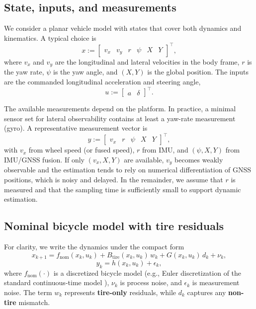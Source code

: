 \subsection{State, inputs, and measurements}\label{ch4_subsec_state_meas}
We consider a planar vehicle model with states that cover both dynamics and kinematics. A typical choice is
\begin{equation}
    x := \begin{bmatrix} v_x & v_y & r & \psi & X & Y \end{bmatrix}^{\top},
\end{equation}
where $v_x$ and $v_y$ are the longitudinal and lateral velocities in the body frame, $r$ is the yaw rate, $\psi$ is the yaw angle, and $(X,Y)$ is the global position.
The inputs are the commanded longitudinal acceleration and steering angle,
\begin{equation}
    u := \begin{bmatrix} a & \delta \end{bmatrix}^{\top}.
\end{equation}

The available measurements depend on the platform. In practice, a minimal sensor set for lateral observability contains at least a yaw-rate measurement (gyro). A representative measurement vector is
\begin{equation}
    y := \begin{bmatrix} v_x & r & \psi & X & Y \end{bmatrix}^{\top},
\end{equation}
with $v_x$ from wheel speed (or fused speed), $r$ from IMU, and $(\psi,X,Y)$ from IMU/GNSS fusion.
If only $(v_x,X,Y)$ are available, $v_y$ becomes weakly observable and the estimation tends to rely on numerical differentiation of GNSS positions, which is noisy and delayed. In the remainder, we assume that $r$ is measured and that the sampling time is sufficiently small to support dynamic estimation.

\subsection{Nominal bicycle model with tire residuals}\label{ch4_subsec_bicycle}
For clarity, we write the dynamics under the compact form
\begin{equation}\label{eq:ch4_nominal_model}
    x_{k+1} = f_{\text{nom}}(x_k,u_k) + B_{\text{tire}}(x_k,u_k)\,w_k + G(x_k,u_k)\,d_k + \nu_k,
\end{equation}
\begin{equation}\label{eq:ch4_measurement_model}
    y_k = h(x_k,u_k) + \epsilon_k,
\end{equation}
where $f_{\text{nom}}(\cdot)$ is a discretized bicycle model (e.g., Euler discretization of the standard continuous-time model \cite{RajamaniBOOK}), $\nu_k$ is process noise, and $\epsilon_k$ is measurement noise.
The term $w_k$ represents \textbf{tire-only} residuals, while $d_k$ captures any \textbf{non-tire} mismatch.

